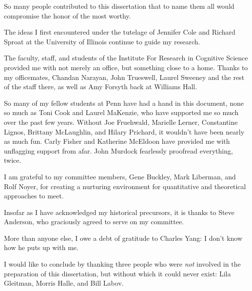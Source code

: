 So many people contributed to this dissertation that to name them all would compromise the honor of the most worthy. 

The ideas I first encountered under the tutelage of Jennifer Cole and Richard Sproat at the University of Illinois continue to guide my research.

The faculty, staff, and students of the Institute For Research in Cognitive Science provided me with not merely an office, but something close to a home. Thanks to my officemates, Chandan Narayan, John Trueswell, Laurel Sweeney and the rest of the staff there, as well as Amy Forsyth back at Williams Hall.

So many of my fellow students at Penn have had a hand in this document, none so much as Toni Cook and Laurel MaKenzie, who have supported me so much over the past few years. Without Joe Fruehwald, Marielle Lerner, Constantine Lignos, Brittany McLaughlin, and Hilary Prichard, it wouldn't have been nearly as much fun. Carly Fisher and Katherine McEldoon have provided me with unflagging support from afar. John Murdock fearlessly proofread everything, twice.

I am grateful to my committee members, Gene Buckley, Mark Liberman, and Rolf Noyer, for creating a nurturing environment for quantitative and theoretical approaches to meet.

Insofar as I have acknowledged my historical precursors, it is thanks to Steve Anderson, who graciously agreed to serve on my committee.

More than anyone else, I owe a debt of gratitude to Charles Yang: I don't know how he puts up with me.

I would like to conclude by thanking three people who were \emph{not} involved in the preparation of this dissertation, but without which it could never exist: Lila Gleitman, Morris Halle, and Bill Labov.
